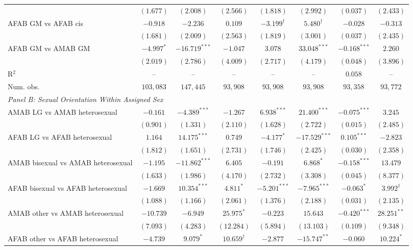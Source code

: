 \begin{table}[htpb!]
{\begin{tabular}{l c c c c c c c}
 & $(1.677)$ & $(2.008)$ & $(2.566)$ & $(1.818)$ & $(2.992)$ & $(0.037)$ & $(2.433)$ \\
AFAB GM vs AFAB cis & $-0.918$ & $-2.236$ & $0.109$ & $-3.199^{\dagger}$ & $5.480^{\dagger}$ & $-0.028$ & $-0.313$ \\
 & $(1.681)$ & $(2.009)$ & $(2.563)$ & $(1.819)$ & $(3.001)$ & $(0.037)$ & $(2.435)$ \\
AFAB GM vs AMAB GM & $-4.997^{*}$ & $-16.719^{***}$ & $-1.047$ & $3.078$ & $33.048^{***}$ & $-0.168^{***}$ & $2.260$ \\
 & $(2.019)$ & $(2.786)$ & $(4.009)$ & $(2.717)$ & $(4.179)$ & $(0.048)$ & $(3.896)$ \\
\hline
R$^2$ & -- & -- & -- & -- & -- & $0.058$ & -- \\
Num. obs. & $103,083$ & $147,445$ & $93,908$ & $93,908$ & $93,908$ & $93,358$ & $93,772$ \\
\hline
\multicolumn{8}{l}{\textit{Panel B: Sexual Orientation Within Assigned Sex}} \\
AMAB LG vs AMAB heterosexual & $-0.161$ & $-4.389^{***}$ & $-1.267$ & $6.938^{***}$ & $21.400^{***}$ & $-0.075^{***}$ & $3.245$ \\
 & $(0.901)$ & $(1.331)$ & $(2.110)$ & $(1.628)$ & $(2.722)$ & $(0.015)$ & $(2.485)$ \\
AFAB LG vs AFAB heterosexual & $1.164$ & $14.175^{***}$ & $0.749$ & $-4.177^{*}$ & $-17.529^{***}$ & $0.105^{***}$ & $-2.823$ \\
 & $(1.812)$ & $(1.651)$ & $(2.731)$ & $(1.746)$ & $(2.425)$ & $(0.030)$ & $(2.358)$ \\
AMAB bisexual vs AMAB heterosexual & $-1.195$ & $-11.862^{***}$ & $6.405$ & $-0.191$ & $6.868^{*}$ & $-0.158^{***}$ & $13.479$ \\
 & $(1.633)$ & $(1.986)$ & $(4.170)$ & $(2.732)$ & $(3.308)$ & $(0.045)$ & $(8.377)$ \\
AFAB bisexual vs AFAB heterosexual & $-1.669$ & $10.354^{***}$ & $4.811^{*}$ & $-5.201^{***}$ & $-7.965^{***}$ & $-0.063^{*}$ & $3.992^{\dagger}$ \\
 & $(1.088)$ & $(1.166)$ & $(2.061)$ & $(1.376)$ & $(2.188)$ & $(0.031)$ & $(2.135)$ \\
AMAB other vs AMAB heterosexual & $-10.739$ & $-6.949$ & $25.975^{*}$ & $-0.223$ & $15.643$ & $-0.420^{***}$ & $28.251^{**}$ \\
 & $(7.093)$ & $(4.283)$ & $(12.284)$ & $(5.894)$ & $(13.103)$ & $(0.109)$ & $(9.348)$ \\
AFAB other vs AFAB heterosexual & $-4.739$ & $9.079^{*}$ & $10.659^{\dagger}$ & $-2.877$ & $-15.747^{**}$ & $-0.060$ & $10.224^{*}$ \\

\end{tabular}}
\end{table}
